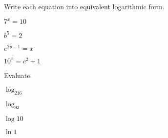 \begin{exercise}
	Write each equation into equivalent logarithmic form.

	\noindent
	\begin{enumerate*}[label={(\arabic*)~}]
		\item  $7^x=10$
		\item  $b^5=2$
		\item $e^{2y-1}=x$
		\item $10^x=c^2+1$
		\hfill\null
	\end{enumerate*}
\end{exercise}

\vfill
\begin{center} \hfill
\end{center}


\begin{exercise}
	Evaluate.\\
	\noindent
	\begin{enumerate*}[label={(\arabic*)~}]
		\item \parbox{0.2\textwidth}{ $\log_216$ }
		\item \parbox{0.2\textwidth}{ $\log_93$ }
		\item \parbox{0.2\textwidth}{ $\log 10$ }
		\item \parbox{0.2\textwidth}{ $\ln 1$ }
		\hfill\null
	\end{enumerate*}
\end{exercise}

\vfill
\begin{center} \hfill
\end{center}


